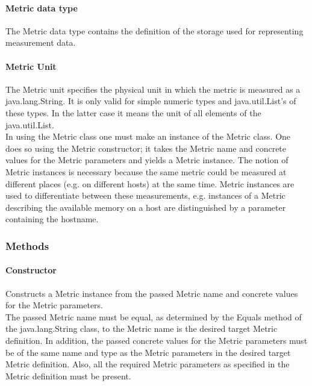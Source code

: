 \documentclass[$Date: 2003/06/26 19:29:31 $]{glabarticle}
\begin{document}
\paragraph{Metric data type} The Metric data type contains the definition of the storage used for 
representing measurement data. 

\paragraph{Metric Unit} The Metric unit specifies the physical unit in which the metric is measured as a 
java.lang.String. It is only valid for simple numeric types and java.util.List's of these types. In the latter case it 
means the  unit of all elements of the java.util.List. \\

In using the Metric class one must make an instance of the Metric class. One does so using the Metric 
constructor; it takes the Metric name and concrete values for the Metric parameters and yields a Metric
instance. The notion of Metric instances is necessary because the same metric could be measured at 
different places (e.g. on different hosts) at the same time. Metric instances are used to differentiate 
between these measurements, e.g. instances of a Metric describing the available memory on a host 
are distinguished by a parameter containing the hostname.  \\


\subsubsection{Methods}

\paragraph{Constructor}

Constructs a Metric instance from the passed Metric name and concrete values for the Metric parameters. \\

The passed Metric name must be equal, as determined by the Equals method of the java.lang.String class, to the
Metric name is the desired target Metric definition. In addition, the passed concrete values for the Metric 
parameters must be of the same name and type as the Metric parameters in the desired target Metric
definition. Also, all the required Metric parameters as specified in the Metric definition must be present. \\
\end{document}
